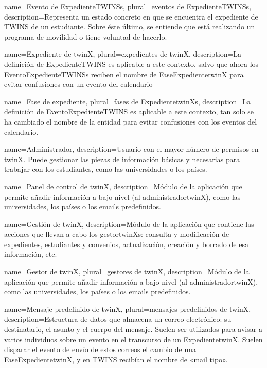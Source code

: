 {
	name=Evento de \glspl{ExpedienteTWINS},
	plural=eventos de \glspl{ExpedienteTWINS},
	description={Representa un estado concreto en que se encuentra el expediente de TWINS de un estudiante. Sobre éste último, se entiende que está realizando un programa de movilidad o tiene voluntad de hacerlo.}
}

{
	name=Expediente de twinX,
	plural=expedientes de twinX,
	description={La definición de \gls{ExpedienteTWINS} es aplicable a este contexto, salvo que ahora los \glspl{EventoExpedienteTWINS} reciben el nombre de \gls{FaseExpedientetwinX} para evitar confusiones con un evento del calendario}
}

{
	name=Fase de expediente,
	plural=fases de \glspl{ExpedientetwinX},
	description={La definición de \gls{EventoExpedienteTWINS} es aplicable a este contexto, tan solo se ha cambiado el nombre de la entidad para evitar confusiones con los eventos del calendario.}
}

{
name=Administrador,
description={Usuario con el mayor número de permisos en twinX. Puede gestionar las piezas de información básicas y necesarias para trabajar con los estudiantes, como las universidades o los países.}
}

{
	name=Panel de control de twinX,
	description={Módulo de la aplicación que permite añadir información a bajo nivel (al \gls{administradortwinX}), como las universidades, los países o los emails predefinidos.}
}

{
	name=Gestión de twinX,
	description={Módulo de la aplicación que contiene las acciones que llevan a cabo los \glspl{gestortwinX}: consulta y modificación de expedientes, estudiantes y convenios, actualización, creación y borrado de esa información, etc.}
}

{
	name=Gestor de twinX,
	plural=gestores de twinX,
	description={Módulo de la aplicación que permite añadir información a bajo nivel (al \gls{administradortwinX}), como las universidades, los países o los emails predefinidos.}
}

{
	name=Mensaje predefinido de twinX,
	plural=mensajes predefinidos de twinX,
	description={Estructura de datos que almacena un correo electrónico: su destinatario, el asunto y el cuerpo del mensaje. Suelen ser utilizados para avisar a varios individuos sobre un evento en el transcurso de un \gls{ExpedientetwinX}. Suelen disparar el evento de envío de estos correos el cambio de una \gls{FaseExpedientetwinX}, y en TWINS recibían el nombre de «mail tipo».}
}

\glsaddall
